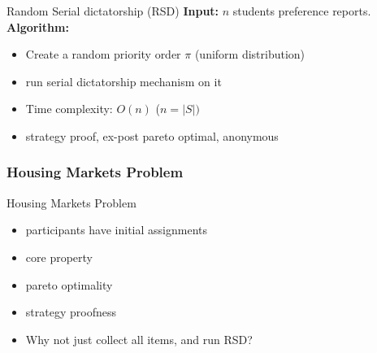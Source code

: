 \begin{frame}{Random Serial dictatorship (RSD)}
    \textbf{Input:} $n$ students preference reports. \\
    \textbf{Algorithm:} 
    \begin{itemize}
    \item Create a random priority order $\pi$ (uniform distribution)
    \item run serial dictatorship mechanism on it
    \item Time complexity: $O(n)$ ($n = |S|)$
    \item strategy proof, ex-post pareto optimal, anonymous
\end{itemize} 
\end{frame}

\subsubsection{Housing Markets Problem}
\begin{frame}{Housing Markets Problem}
    \begin{itemize}
    \item participants have initial assignments
    \item core property %
    \item pareto optimality 
    \item strategy proofness
    \item <2->Why not just collect all items, and run RSD?
\end{itemize}    
\end{frame}


